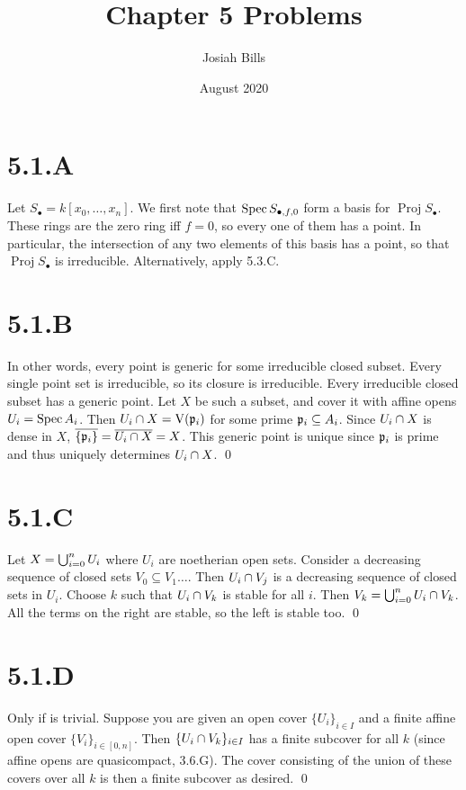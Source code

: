 \documentclass{article}
\title{Chapter 5 Problems}
\author{Josiah Bills}
\date{August 2020}
\begin{document}
\maketitle

\section{5.1.A}
Let $S_{\bullet}=k[x_0, \dots, x_n]$. We first note that $\operatorname{Spec} S_{\bullet, f, 0}$ form a
basis for $\operatorname{Proj} S_{\bullet}$. These rings are the zero ring iff
$f=0$, so every one of them has a point. In particular, the
intersection of any two elements of this basis has a point, so that
$\operatorname{Proj} S_{\bullet}$ is irreducible. Alternatively, apply 5.3.C.

\section{5.1.B}
In other words, every point is generic for some irreducible closed subset.
Every single point set is irreducible, so its closure is irreducible. Every
irreducible closed subset has a generic point. Let $X$ be
such a subset, and cover it with affine opens $U_i=\operatorname{Spec} A_i$. Then
$U_i \cap X=\operatorname{V}(\mathfrak{p}_i)$ for some prime $\mathfrak{p}_i \subseteq A_i$. Since
$U_i \cap X$ is dense in $X$,
$\overline{\{\mathfrak{p}_i\}}=\overline{U_i \cap X}=X$. This generic point is unique since
$\mathfrak{p}_i$ is prime and thus uniquely determines
$U_i \cap X$. \qed

\section{5.1.C}
Let $X=\bigcup_{i=0}^n U_i$ where $U_i$ are noetherian open
sets. Consider a decreasing sequence of closed sets $V_0 \subseteq V_1 \dots$.
Then $U_i \cap V_j$ is a decreasing sequence of closed sets in
$U_i$. Choose $k$ such that
$U_i \cap V_k$ is stable for all $i$. Then
$V_k=\bigcup_{i=0}^n U_i \cap V_k$. All the terms on the right are stable, so the left is
stable too. \qed

\section{5.1.D}
Only if is trivial. Suppose you are given an open cover $\{U_i\}_{i \in I}$
and a finite affine open cover $\{V_i\}_{i \in [0, n]}$. Then
$\{U_i\cap V_k\}_{i \in I}$ has a finite subcover for all $k$
(since affine opens are quasicompact, 3.6.G). The cover consisting of the union
of these covers over all $k$ is then a finite subcover as
desired. \qed
\end{document}
